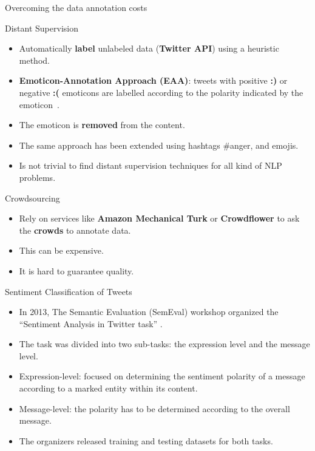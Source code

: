 \documentclass[handout]{beamer}
\begin{document}
\begin{frame}{Overcoming the data annotation costs}
\begin{scriptsize}
\begin{block}{Distant Supervision}
  \begin{itemize}
   \item Automatically \textbf{label} unlabeled data (\textbf{Twitter API}) using a heuristic method.
   \item \textbf{Emoticon-Annotation Approach (EAA)}: tweets with positive \textcolor[rgb]{0.00,0.00,1.00}{\textbf{:)}} or negative \textcolor[rgb]{1.00,0.00,0.00}{\textbf{:(}} emoticons are labelled according to the polarity indicated by the emoticon~\cite{Read2005}.
  \item The emoticon is \textbf{removed} from the content.
  \item The same approach has been extended using hashtags \#anger, and emojis.
\item Is not trivial to find distant supervision techniques for all kind of NLP problems.
\end{itemize} 
 
\end{block}

\begin{block}{Crowdsourcing}
  \begin{itemize}
\item Rely on services like \textbf{Amazon Mechanical Turk} or \textbf{Crowdflower} to ask the \textbf{crowds} to annotate data.
\item This can be expensive.
\item It is hard to guarantee quality. 
   \end{itemize} 
 
\end{block}

\end{scriptsize}

\end{frame}




\begin{frame}{Sentiment Classification of Tweets}
\begin{scriptsize}
\begin{itemize}
\item In 2013, The Semantic Evaluation (SemEval) workshop organized the
``Sentiment Analysis in Twitter
task'' \cite{Semeval2013}.
 \item The task was divided into two sub-tasks: the expression
level and the message level. 
\item Expression-level: focused on determining
the sentiment polarity of a message according to a marked entity within its content.
\item Message-level: the polarity has to be determined according to
the overall message.
\item  The organizers released training and testing datasets
for both tasks.
\cite{Semeval2013}
\end{itemize}
\end{scriptsize}
\end{frame}
\end{document}
